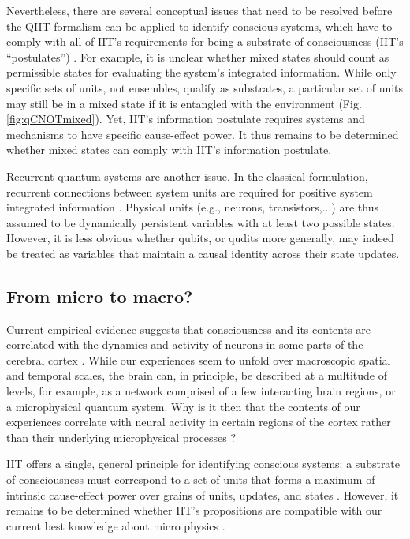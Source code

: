 \documentclass[preprints, article, accept, pdftex, moreauthors, letterpaper]{Definitions/mdpi}
\renewcommand{\=}[1]{\stackrel{#1}{=}} %
\renewcommand{\*}{\otimes}%
\begin{document}
Nevertheless, there are several conceptual issues that need to be resolved before the QIIT formalism can be applied to identify conscious systems, which have to comply with all of IIT's requirements for being a substrate of consciousness (IIT's ``postulates'') \cite{Oizumi2014}. 
For example, it is unclear whether mixed states should count as permissible states for evaluating the system's integrated information. While only specific sets of units, not ensembles, qualify as substrates, a particular set of units may still be in a mixed state if it is entangled with the environment (Fig. \ref{fig:qCNOTmixed}).
Yet, IIT's information postulate requires systems and mechanisms to have specific cause-effect power. It thus remains to be determined whether mixed states can comply with IIT's information postulate.

Recurrent quantum systems are another issue. In the classical formulation, recurrent connections between system units are required for positive system integrated information \cite{Oizumi2014, Marshall2022}. Physical units (e.g., neurons, transistors,...) are thus assumed to be dynamically persistent variables with at least two possible states. However, it is less obvious whether qubits, or qudits more generally, may indeed be treated as variables that maintain a causal identity across their state updates.


\subsection{From micro to macro?}

Current empirical evidence suggests that consciousness and its contents are correlated with the dynamics and activity of neurons in some parts of the cerebral cortex \cite{Koch2016}. 
While our experiences seem to unfold over macroscopic spatial and temporal scales, the brain can, in principle, be described at a multitude of levels, for example, as a network comprised of a few interacting brain regions, or a microphysical quantum system. Why is it then that the contents of our experiences correlate with neural activity in certain regions of the cortex rather than their underlying microphysical processes \cite{Tegmark2015,Hoel2016}?

IIT offers a single, general principle for identifying conscious systems: a substrate of consciousness must correspond to a set of units that forms a maximum of intrinsic cause-effect power over grains of units, updates, and states \cite{Tononi2016, Hoel2016, Marshall2018}. However, it remains to be determined whether IIT's propositions are compatible with our current best knowledge about micro physics \cite{Barrett2019, Carroll2021}. 
\end{document}
